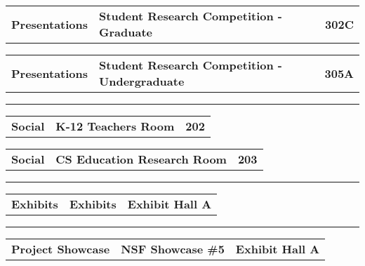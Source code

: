 \begin{longtable}[l]{@{}p{1in}@{}p{3in}@{}r}
    {\sffamily\large\textbf{Presentations}} & 
    {\sffamily\large\textbf{Student Research Competition - Graduate}} & 
    {\sffamily\large\textbf{302C}} \\
\end{longtable}    
\begin{longtable}[l]{@{}p{1in}@{}p{3in}@{}r}
    {\sffamily\large\textbf{Presentations}} & 
    {\sffamily\large\textbf{Student Research Competition - Undergraduate}} & 
    {\sffamily\large\textbf{305A}} \\
\end{longtable}    
\vspace{0.5em}
\noindent\rule{5in}{0.02cm}
\vspace{0.5em}
\noindent
{}
\begin{longtable}[l]{@{}p{1in}@{}p{3in}@{}r}
    {\sffamily\large\textbf{Social}} & 
    {\sffamily\large\textbf{K-12 Teachers Room}} & 
    {\sffamily\large\textbf{202}} \\
\end{longtable}    
\begin{longtable}[l]{@{}p{1in}@{}p{3in}@{}r}
    {\sffamily\large\textbf{Social}} & 
    {\sffamily\large\textbf{CS Education Research Room}} & 
    {\sffamily\large\textbf{203}} \\
\end{longtable}    
\vspace{0.5em}
\noindent\rule{5in}{0.02cm}
\vspace{0.5em}
\noindent
{}
\begin{longtable}[l]{@{}p{1in}@{}p{3in}@{}r}
    {\sffamily\large\textbf{Exhibits}} & 
    {\sffamily\large\textbf{Exhibits}} & 
    {\sffamily\large\textbf{Exhibit Hall A}} \\
\end{longtable}    
\vspace{0.5em}
\noindent\rule{5in}{0.02cm}
\vspace{0.5em}
\noindent
{}
\begin{longtable}[l]{@{}p{1in}@{}p{3in}@{}r}
    {\sffamily\large\textbf{Project Showcase}} & 
    {\sffamily\large\textbf{NSF Showcase \#5}} & 
    {\sffamily\large\textbf{Exhibit Hall A}} \\
\end{longtable}    
